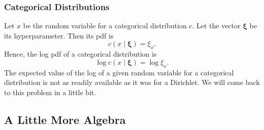 \documentclass[12pt]{article}
\begin{document}
\subsubsection{Categorical Distributions}

Let $x$ be the random variable for a categorical distribution $c$.  Let the
vector $\bm{\xi}$ be its hyperparameter.  Then its pdf is
\begin{equation}\label{eq:catpdf}
    c(x \mid \bm{\xi}) = \xi_{x}.
\end{equation}
Hence, the log pdf of a categorical distribution is
\begin{equation}\label{eq:logcatpdf}
    \log c(x \mid \bm{\xi}) = \log \xi_{x}.
\end{equation}
The expected value of the log of a given random variable for a categorical
distribution is not as readily available as it was for a Dirichlet.  We will
come back to this problem in a little bit.

\subsection{A Little More Algebra}
\end{document}
